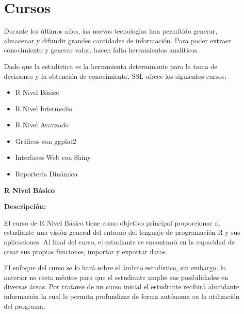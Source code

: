 \documentclass[12pt,a4paper,oneside]{article}\usepackage[]{graphicx}\usepackage[]{color}
\begin{document}
\section{Cursos}

Durante los últimos años, las nuevas tecnologías han permitido generar, almacenar y difundir grandes cantidades de información. Para poder extraer conocimiento y generar valor, hacen falta herramientas analíticas.\newline

Dado que la estadística es la herramienta determinante para la toma de decisiones y la obtención de conocimiento, SSL ofrece los siguientes cursos:
\begin{itemize}
  \item R Nivel Básico
  \item R Nivel Intermedio
  \item R Nivel Avanzado
  \item Gráficos con ggplot2
  \item Interfaces Web con Shiny
  \item Reportería Dinámica
\end{itemize}


\newpage

\begin{center}
{\bf \Large R Nivel Básico}
\end{center}

{\bf \large Descripción:}\newline
  
  El curso de R Nivel Básico tiene como objetivo principal proporcionar al estudiante una visión general del entorno del lenguaje de programación R y sus aplicaciones. Al final del curso, el estudiante se encontrará en la capacidad de crear sus propias funciones, importar y exportar datos. \newline
  
  El enfoque del curso se lo hará sobre el ámbito estadístico, sin embargo, lo anterior no resta méritos para que el estudiante amplie sus posibilidades en diversas áreas. Por tratarse de un curso inicial el estudiante recibirá abundante información la cual le permita profundizar de forma autónoma en la utilización del programa.\newline
  
\end{document}
